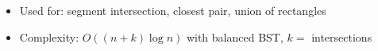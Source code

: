 \begin{itemize}
  \item Used for: segment intersection, closest pair, union of rectangles
  \item Complexity: $O((n+k)\log n)$ with balanced BST, $k =$ intersections
\end{itemize}
